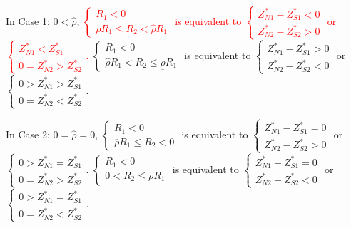 \documentclass[10pt]{article}
\newcommand{\hhred}{\textcolor{red}}
\begin{document}
In Case 1: $ 0 < {\hat \rho} $, \hhred{$ \left\{ \begin{matrix} R_1 < 0 \\ \overline{\rho} R_1 \leqslant R_2 < {\hat \rho} R_1 \end{matrix} \right. $ is equivalent to $ \left\{ \begin{matrix} Z_{N 1}^* - Z_{S 1}^* < 0 \\ Z_{N 2}^* - Z_{S 2}^* > 0 \end{matrix} \right. $ or $ \left\{ \begin{matrix} Z_{N 1}^* < Z_{S 1}^* \\ 0 = Z_{N 2}^* > Z_{S 2}^* \end{matrix} \right. $.}
$ \left\{ \begin{matrix} R_1 < 0 \\ {\hat \rho} R_1 < R_2 \leqslant \underline{\rho} R_1 \end{matrix} \right. $ is equivalent to $ \left\{ \begin{matrix} Z_{N 1}^* - Z_{S 1}^* > 0 \\ Z_{N 2}^* - Z_{S 2}^* < 0 \end{matrix} \right. $ or $ \left\{ \begin{matrix} 0 > Z_{N 1}^* > Z_{S 1}^* \\ 0 = Z_{N 2}^* < Z_{S 2}^* \end{matrix} \right. $.

In Case 2: $ 0 = {\hat \rho} = 0 $, $ \left\{ \begin{matrix} R_1 < 0 \\ \overline{\rho} R_1 \leqslant R_2 < 0 \end{matrix} \right. $ is equivalent to $ \left\{ \begin{matrix} Z_{N 1}^* - Z_{S 1}^* = 0 \\ Z_{N 2}^* - Z_{S 2}^* > 0 \end{matrix} \right. $ or $ \left\{ \begin{matrix} 0 > Z_{N 1}^* = Z_{S 1}^* \\ 0 = Z_{N 2}^* > Z_{S 2}^* \end{matrix} \right. $.
$ \left\{ \begin{matrix} R_1 < 0 \\ 0 < R_2 \leqslant \underline{\rho} R_1 \end{matrix} \right. $ is equivalent to $ \left\{ \begin{matrix} Z_{N 1}^* - Z_{S 1}^* = 0 \\ Z_{N 2}^* - Z_{S 2}^* < 0 \end{matrix} \right. $ or $ \left\{ \begin{matrix} 0 > Z_{N 1}^* = Z_{S 1}^* \\ 0 = Z_{N 2}^* < Z_{S 2}^* \end{matrix} \right. $.
\end{document}

